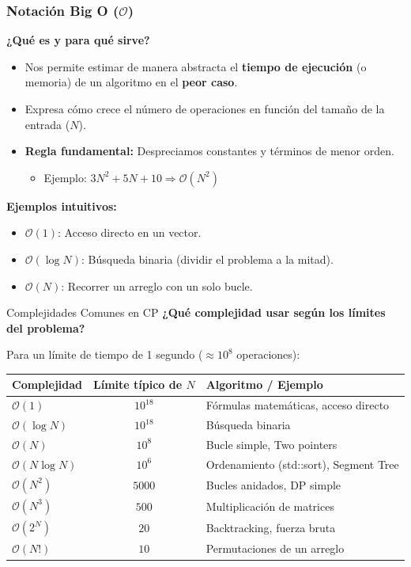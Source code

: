 \documentclass{beamer}
\begin{document}
\begin{frame}
  \frametitle{Notación Big O ($\mathcal{O}$)}
  \textbf{¿Qué es y para qué sirve?}
  \begin{itemize}
    \item Nos permite estimar de manera abstracta el \textbf{tiempo de ejecución} (o memoria) de un algoritmo en el \textbf{peor caso}.
    \item Expresa cómo crece el número de operaciones en función del tamaño de la entrada ($N$).
    \item \textbf{Regla fundamental:} Despreciamos constantes y términos de menor orden. 
    \begin{itemize}
      \item Ejemplo: $3N^2 + 5N + 10 \Rightarrow \mathcal{O}(N^2)$
    \end{itemize}
  \end{itemize}
  
  \vspace{0.2cm}
  \textbf{Ejemplos intuitivos:}
  \begin{itemize}
    \item $\mathcal{O}(1)$: Acceso directo en un vector.
    \item $\mathcal{O}(\log N)$: Búsqueda binaria (dividir el problema a la mitad).
    \item $\mathcal{O}(N)$: Recorrer un arreglo con un solo bucle.
  \end{itemize}
\end{frame}

\begin{frame}{Complejidades Comunes en CP}
  \textbf{¿Qué complejidad usar según los límites del problema?}
  
  Para un límite de tiempo de 1 segundo ($\approx 10^8$ operaciones):
  
  \begin{table}
    \centering
    \small
    \setlength{\tabcolsep}{4pt}
    \begin{tabular}{|l|c|l|}
      \hline
      \textbf{Complejidad} & \textbf{Límite típico de $N$} & \textbf{Algoritmo / Ejemplo} \\
      \hline
      $\mathcal{O}(1)$ & $10^{18}$ & Fórmulas matemáticas, acceso directo \\
      $\mathcal{O}(\log N)$ & $10^{18}$ & Búsqueda binaria \\
      $\mathcal{O}(N)$ & $10^8$ & Bucle simple, Two pointers \\
      $\mathcal{O}(N \log N)$ & $10^6$ & Ordenamiento (std::sort), Segment Tree \\
      $\mathcal{O}(N^2)$ & $5000$ & Bucles anidados, DP simple \\
      $\mathcal{O}(N^3)$ & $500$ & Multiplicación de matrices \\
      $\mathcal{O}(2^N)$ & $20$ & Backtracking, fuerza bruta \\
      $\mathcal{O}(N!)$ & $10$ & Permutaciones de un arreglo \\
      \hline
    \end{tabular}
  \end{table}
\end{frame}
\end{document}
